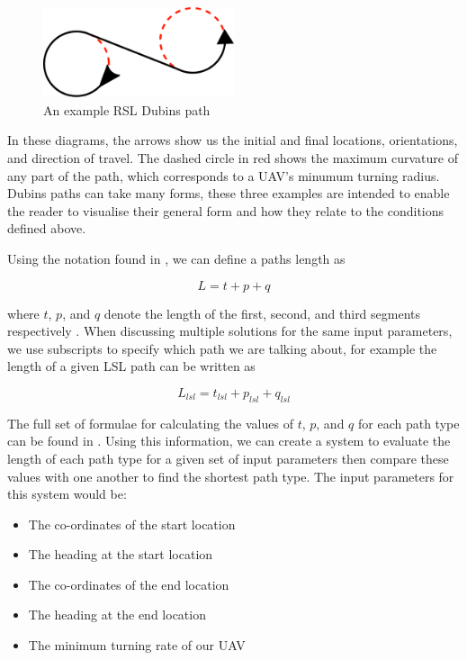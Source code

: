 \begin{figure}[htbp!] 
\centering    
\includegraphics[width=0.5\textwidth]{RSL}
\caption[Dubins RSL Path]{An example RSL Dubins path}
\label{fig:rsl}
\end{figure}

In these diagrams, the arrows show us the initial and final locations, orientations, and direction of travel. The dashed circle in red shows the maximum curvature of any part of the path, which corresponds to a UAV's minumum turning radius. Dubins paths can take many forms, these three examples are intended to enable the reader to visualise their general form and how they relate to the conditions defined above.

Using the notation found in \cite{shkel2001classification}, we can define a paths length as

\begin{equation}
	L = t + p + q
\end{equation}

where $t$, $p$, and $q$ denote the length of the first, second, and third segments respectively \cite{dubins1957curves}. When discussing multiple solutions for the same input parameters, we use subscripts to specify which path we are talking about, for example the length of a given LSL path can be written as

\begin{equation}
	L_{lsl} = t_{lsl} + p_{lsl} + q_{lsl}
\end{equation}

The full set of formulae for calculating the values of $t$, $p$, and $q$ for each path type can be found in \cite{shkel2001classification}. Using this information, we can create a system to evaluate the length of each path type for a given set of input parameters then compare these values with one another to find the shortest path type. The input parameters for this system would be:

\begin{itemize}
	\item The co-ordinates of the start location
	\item The heading at the start location
	\item The co-ordinates of the end location
	\item The heading at the end location
	\item The minimum turning rate of our UAV
\end{itemize}

